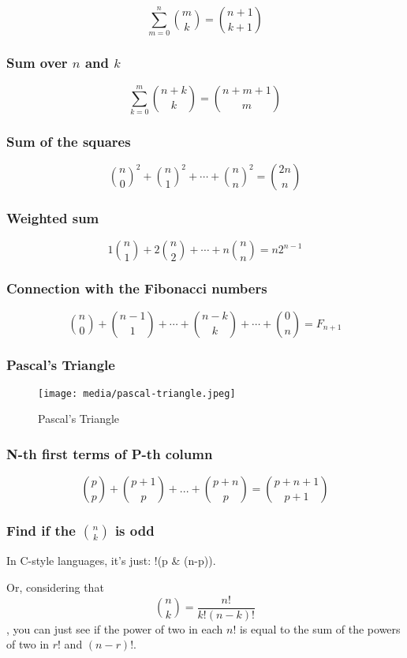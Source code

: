     \[ \sum_{m = 0}^n \binom m k = \binom {n + 1} {k + 1} \]



\subsubsection{Sum over $n$ and $k$}

    \[ \sum_{k = 0}^m  \binom {n + k} k = \binom {n + m + 1} m \]

\subsubsection{Sum of the squares}

\[ {\binom n 0}^2 + {\binom n 1}^2 + \cdots + {\binom n n}^2 = \binom {2n} n \]


\subsubsection{Weighted sum}

    \[ 1 \binom n 1 + 2 \binom n 2 + \cdots + n \binom n n = n 2^{n-1} \]



\subsubsection{Connection with the Fibonacci numbers}

\[ \binom n 0 + \binom {n-1} 1 + \cdots + \binom {n-k} k + \cdots + \binom 0 n = F_{n+1} \]


\subsubsection{Pascal's Triangle}

 \begin{figure}[h]
    \centering
    \texttt{[image: media/pascal-triangle.jpeg]}
    \caption{Pascal's Triangle}
    \label{fig:pascal-triangle}
\end{figure}

\subsubsection{N-th first terms of P-th column}

\begin{equation}
    \binom{p}{p} + \binom{p+1}{p} + ... + \binom{p+n}{p} = \binom{p+n+1}{p+1}
\end{equation}


\subsubsection{Find if the $\binom{n}{k}$ is odd}

In C-style languages, it's just: !(p \& (n-p)).

Or, considering that $$ \binom n k = \frac {n!} {k!(n-k)!} $$, you can just see if the power of two in each $n!$ is equal to the sum of the powers of two in $r!$ and $(n-r)!$.


